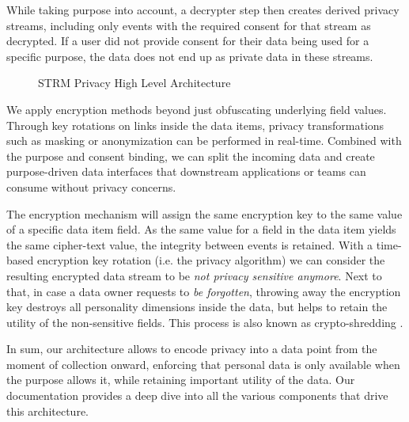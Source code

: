\documentclass[11pt]{article} %
\begin{document}
While taking purpose into account, a decrypter step then creates derived privacy streams, including only events with the required consent for that stream as decrypted. If a user did not provide consent for their data being used for a specific purpose, the data does not end up as private data in these streams.

\begin{figure}[ht!]
  \caption{\label{fig:arch}STRM Privacy High Level Architecture}
\end{figure}

We apply encryption methods beyond just obfuscating underlying field values. Through key rotations on links inside the data items, privacy transformations such as masking or anonymization can be performed in real-time. Combined with the purpose and consent binding, we can split the incoming data and create purpose-driven data interfaces that downstream applications or teams can consume without privacy concerns. 

The encryption mechanism will assign the same encryption key to the same value of a specific data item field. As the same value for a field in the data item yields the same cipher-text value, the integrity between events is retained. With a time-based encryption key rotation (i.e. the privacy algorithm) we can consider the resulting encrypted data stream to be \emph{not privacy sensitive anymore}. Next to that, in case a data owner requests to \textit{be forgotten}, throwing away the encryption key destroys all personality dimensions inside the data, but helps to retain the utility of the non-sensitive fields. This process is also known as crypto-shredding \cite{comptonassured}.

In sum, our architecture allows to encode privacy into a data point from the moment of collection onward, enforcing that personal data is only available when the purpose allows it, while retaining important utility of the data. Our documentation \cite{strmprivacydocs} provides a deep dive into all the various components that drive this architecture.
\end{document}
